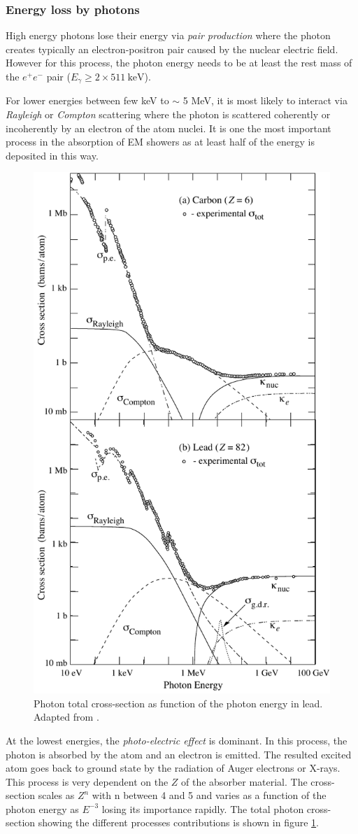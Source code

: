 \subsubsection{Energy loss by photons}

High energy photons lose their energy via \textit{pair production} where the photon creates typically an electron-positron pair caused by the nuclear electric field. However for this process, the photon energy needs to be at least the rest mass of the $e^+e^-$ pair ($E_{\gamma} \geq 2 \times \SI{511}{\kilo\eV}$).

For lower energies between few keV to $\sim$ 5 MeV, it is most likely to interact via \textit{Rayleigh} or \textit{Compton} scattering where the photon is scattered coherently or incoherently by an electron of the atom nuclei. It is one the most important process in the absorption of EM showers as at least half of the energy is deposited in this way.
\begin{figure}[htbp!]
  \centering
  \includegraphics[width=0.5\linewidth]{chap2/fig/sigma_both_06.pdf}
  \caption{Photon total cross-section as function of the photon energy in lead. Adapted from \cite{Patrignani:2016xqp}.} \label{fig:GammaEMloss}
\end{figure}

At the lowest energies, the  \textit{photo-electric effect} is dominant. In this process, the photon is absorbed by the atom and an electron is emitted. The resulted excited atom goes back to ground state by the radiation of Auger electrons or X-rays. This process is very dependent on the $Z$ of the absorber material. The cross-section scales as $Z^n$ with n between 4 and 5 and varies as a function of the photon energy as $E^{-3}$ losing its importance rapidly. The total photon cross-section showing the different processes contributions is shown in figure \ref{fig:GammaEMloss}.

